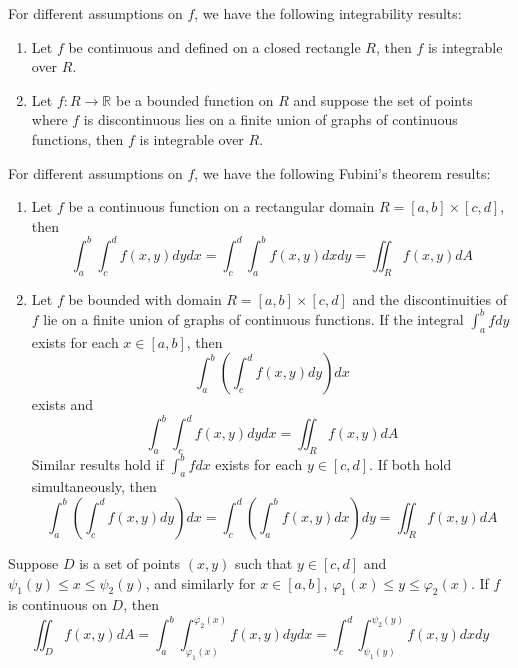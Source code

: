 \documentclass[openany]{book}
\newcommand{\R}{\mathbb{R}}
\begin{document}
\begin{prop}[integrability]
    For different assumptions on $f$, we have the following integrability results:
    \begin{enumerate}
        \item Let $f$ be continuous and defined on a closed rectangle $R$, then $f$ is integrable over $R$.
        \item Let $f:R\to\R$ be a bounded function on $R$ and suppose the set of points where $f$ is discontinuous lies on a finite union of graphs of continuous functions, then $f$ is integrable over $R$.
    \end{enumerate}
\end{prop}


\begin{prop}
    For different assumptions on $f$, we have the following Fubini's theorem results:
    \begin{enumerate}
        \item   Let $f$ be a continuous function on a rectangular domain $R=[a,b]\times[c,d]$, then 
        \begin{equation*}
            \int_a^b\int_c^df(x,y)dydx=\int_c^d\int_a^bf(x,y)dxdy=\iint_Rf(x,y)dA
        \end{equation*}
        \item Let $f$ be bounded with domain $R=[a,b]\times[c,d]$ and the discontinuities of $f$ lie on a finite union of graphs of continuous functions. If the integral $\int_a^bfdy$ exists for each $x\in[a,b]$, then 
        \begin{equation*}
            \int_a^b\left(\int_c^df(x,y)dy\right)dx
        \end{equation*}
        exists and 
        \begin{equation*}
            \int_a^b\int_c^df(x,y)dydx=\iint_Rf(x,y)dA
        \end{equation*}
        Similar results hold if $\int_a^bfdx$ exists for each $y\in[c,d]$. If both hold simultaneously, then 
        \begin{equation*}
            \int_a^b\left(\int_c^df(x,y)dy\right)dx=\int_c^d\left(\int_a^bf(x,y)dx\right)dy=\iint_Rf(x,y)dA
        \end{equation*}
    \end{enumerate}

  
\end{prop}



\begin{prop}
    Suppose $D$ is a set of points $(x,y)$ such that $y\in [c,d]$ and $\psi_1(y)\leq x\leq\psi_2(y)$, and similarly for $x\in [a,b]$, $\varphi_1(x)\leq y\leq\varphi_2(x)$. If $f$ is continuous on $D$, then 
    \begin{equation*}
        \iint_Df(x,y)dA=\int_a^b\int_{\varphi_1(x)}^{\varphi_2(x)}f(x,y)dydx=\int_c^d\int_{\psi_1(y)}^{\psi_2(y)}f(x,y)dxdy
    \end{equation*}
\end{prop}
\end{document}
